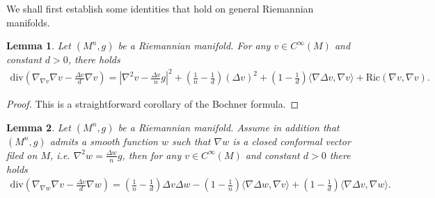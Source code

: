 \documentclass[12pt]{amsart}%
\newtheorem{lemma}{Lemma}
\numberwithin{equation}{section}
\numberwithin{lemma}{section}
\numberwithin{proposition}{section}
\numberwithin{corollary}{section}
\numberwithin{remark}{section}
\begin{document}
 We shall first establish some identities that hold on general Riemannian manifolds.
\begin{lemma}\label{cor.div 1}
    Let $(M^n,g)$ be a Riemannian manifold. For any $v\in C^{\infty}(M)$ and constant $d>0$, there holds
    \begin{align}\label{eq. div 1}
        \mathrm{div}\left(\nabla_{\nabla v}\nabla v-\frac{\Delta v}{d}\nabla v\right)
        =\left|\nabla ^2 v-\frac{\Delta v}{n}g\right|^2
        +\left(\frac{1}{n}-\frac{1}{d}\right)(\Delta v)^2
        +\left(1-\frac{1}{d}\right)
        \langle\nabla \Delta v,\nabla v\rangle+\mathrm{Ric}(\nabla v,\nabla v).
    \end{align}
\end{lemma}
\begin{proof}
    This is a straightforward corollary of the Bochner formula.
\end{proof}
\begin{lemma}\label{cor. div 1w}
    Let $(M^n,g)$ be a Riemannian manifold. Assume in addition that $(M^n,g)$ admits a smooth function $w$ such that $\nabla w$ is a closed conformal vector filed on $M$, i.e. $\nabla ^2 w=\frac{\Delta w}{n}g$, then for any $v\in C^{\infty}(M)$ and constant $d>0$ there holds
    \begin{align}\label{eq. div 1w}
        \mathrm{div}\left(\nabla_{\nabla w}\nabla v-\frac{\Delta v}{d}\nabla w\right)
        =\left(\frac{1}{n}-\frac{1}{d}\right)\Delta v\Delta w
        -\left(1-\frac{1}{n}\right)\langle\nabla \Delta w,\nabla v\rangle
        +\left(1-\frac{1}{d}\right)\langle\nabla \Delta v,\nabla w\rangle.
    \end{align}
\end{lemma}
\end{document}

